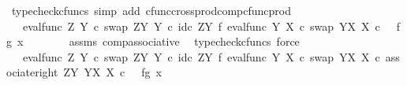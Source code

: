 \begin{isabellebody}
\ {\isacharparenleft}{\kern0pt}typecheck{\isacharunderscore}{\kern0pt}cfuncs{\isacharcomma}{\kern0pt}\ simp\ add{\isacharcolon}{\kern0pt}\ cfunc{\isacharunderscore}{\kern0pt}cross{\isacharunderscore}{\kern0pt}prod{\isacharunderscore}{\kern0pt}comp{\isacharunderscore}{\kern0pt}cfunc{\isacharunderscore}{\kern0pt}prod{\isacharparenright}{\kern0pt}\isanewline
\ \ \ \ \isamarkupfalse%
\ \isamarkupfalse%
\ {\isachardoublequoteopen}{\isachardot}{\kern0pt}{\isachardot}{\kern0pt}{\isachardot}{\kern0pt}\ {\isacharequal}{\kern0pt}\ {\isacharparenleft}{\kern0pt}eval{\isacharunderscore}{\kern0pt}func\ Z\ Y\ {\isasymcirc}\isactrlsub c\ swap\ {\isacharparenleft}{\kern0pt}Z\isactrlbsup Y\isactrlesup {\isacharparenright}{\kern0pt}\ Y\ {\isasymcirc}\isactrlsub c\ {\isacharparenleft}{\kern0pt}id\isactrlsub c\ {\isacharparenleft}{\kern0pt}Z\isactrlbsup Y\isactrlesup {\isacharparenright}{\kern0pt}\ {\isasymtimes}\isactrlsub f\ eval{\isacharunderscore}{\kern0pt}func\ Y\ X\ {\isasymcirc}\isactrlsub c\ swap\ {\isacharparenleft}{\kern0pt}Y\isactrlbsup X\isactrlesup {\isacharparenright}{\kern0pt}\ X{\isacharparenright}{\kern0pt}{\isacharparenright}{\kern0pt}\ {\isasymcirc}\isactrlsub c\ \ \ {\isasymlangle}f{\isacharcomma}{\kern0pt}{\isasymlangle}g{\isacharcomma}{\kern0pt}\ x{\isasymrangle}{\isasymrangle}{\isachardoublequoteclose}\isanewline
\ \ \ \ \ \ \isamarkupfalse%
\ assms\ comp{\isacharunderscore}{\kern0pt}associative{}\ \isamarkupfalse%
\ {\isacharparenleft}{\kern0pt}typecheck{\isacharunderscore}{\kern0pt}cfuncs{\isacharcomma}{\kern0pt}\ force{\isacharparenright}{\kern0pt}\isanewline
\ \ \ \ \isamarkupfalse%
\ \isamarkupfalse%
\ {\isachardoublequoteopen}{\isachardot}{\kern0pt}{\isachardot}{\kern0pt}{\isachardot}{\kern0pt}\ {\isacharequal}{\kern0pt}\ {\isacharparenleft}{\kern0pt}eval{\isacharunderscore}{\kern0pt}func\ Z\ Y\ {\isasymcirc}\isactrlsub c\ swap\ {\isacharparenleft}{\kern0pt}Z\isactrlbsup Y\isactrlesup {\isacharparenright}{\kern0pt}\ Y\ {\isasymcirc}\isactrlsub c\ {\isacharparenleft}{\kern0pt}id\isactrlsub c\ {\isacharparenleft}{\kern0pt}Z\isactrlbsup Y\isactrlesup {\isacharparenright}{\kern0pt}\ {\isasymtimes}\isactrlsub f\ eval{\isacharunderscore}{\kern0pt}func\ Y\ X\ {\isasymcirc}\isactrlsub c\ swap\ {\isacharparenleft}{\kern0pt}Y\isactrlbsup X\isactrlesup {\isacharparenright}{\kern0pt}\ X{\isacharparenright}{\kern0pt}{\isacharparenright}{\kern0pt}\ {\isasymcirc}\isactrlsub c\ associate{\isacharunderscore}{\kern0pt}right\ {\isacharparenleft}{\kern0pt}Z\isactrlbsup Y\isactrlesup {\isacharparenright}{\kern0pt}\ {\isacharparenleft}{\kern0pt}Y\isactrlbsup X\isactrlesup {\isacharparenright}{\kern0pt}\ X\ {\isasymcirc}\isactrlsub c\ \ \ {\isasymlangle}{\isasymlangle}f{\isacharcomma}{\kern0pt}g{\isasymrangle}{\isacharcomma}{\kern0pt}\ x\ {\isasymrangle}{\isachardoublequoteclose}\isanewline

\end{isabellebody}
